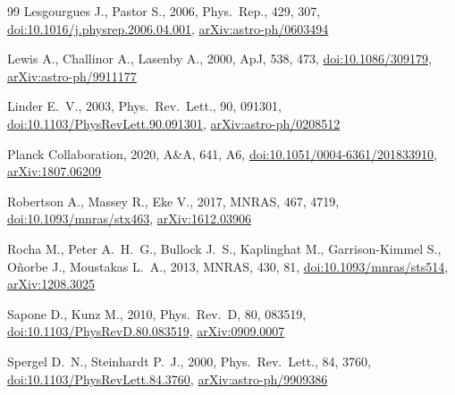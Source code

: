 \documentclass[fleqn,usenatbib]{mnras}
\begin{document}
\begin{thebibliography}{99}
Lesgourgues J., Pastor S., 2006, Phys.\ Rep., 429, 307,
\href{https://doi.org/10.1016/j.physrep.2006.04.001}{doi:10.1016/j.physrep.2006.04.001},
\href{https://arxiv.org/abs/astro-ph/0603494}{arXiv:astro-ph/0603494}

Lewis A., Challinor A., Lasenby A., 2000, ApJ, 538, 473,
\href{https://doi.org/10.1086/309179}{doi:10.1086/309179},
\href{https://arxiv.org/abs/astro-ph/9911177}{arXiv:astro-ph/9911177}

Linder E.~V., 2003, Phys.\ Rev.\ Lett., 90, 091301,
\href{https://doi.org/10.1103/PhysRevLett.90.091301}{doi:10.1103/PhysRevLett.90.091301},
\href{https://arxiv.org/abs/astro-ph/0208512}{arXiv:astro-ph/0208512}

{Planck Collaboration}, 2020, A\&A, 641, A6,
\href{https://doi.org/10.1051/0004-6361/201833910}{doi:10.1051/0004-6361/201833910},
\href{https://arxiv.org/abs/1807.06209}{arXiv:1807.06209}

Robertson A., Massey R., Eke V., 2017, MNRAS, 467, 4719,
\href{https://doi.org/10.1093/mnras/stx463}{doi:10.1093/mnras/stx463},
\href{https://arxiv.org/abs/1612.03906}{arXiv:1612.03906}

Rocha M., Peter A.~H.~G., Bullock J.~S., Kaplinghat M., Garrison-Kimmel S., O{\~n}orbe J., Moustakas L.~A., 2013, MNRAS, 430, 81,
\href{https://doi.org/10.1093/mnras/sts514}{doi:10.1093/mnras/sts514},
\href{https://arxiv.org/abs/1208.3025}{arXiv:1208.3025}

Sapone D., Kunz M., 2010, Phys.\ Rev.\ D, 80, 083519,
\href{https://doi.org/10.1103/PhysRevD.80.083519}{doi:10.1103/PhysRevD.80.083519},
\href{https://arxiv.org/abs/0909.0007}{arXiv:0909.0007}

Spergel D.~N., Steinhardt P.~J., 2000, Phys.\ Rev.\ Lett., 84, 3760,
\href{https://doi.org/10.1103/PhysRevLett.84.3760}{doi:10.1103/PhysRevLett.84.3760},
\href{https://arxiv.org/abs/astro-ph/9909386}{arXiv:astro-ph/9909386}


\end{thebibliography}
\end{document}
